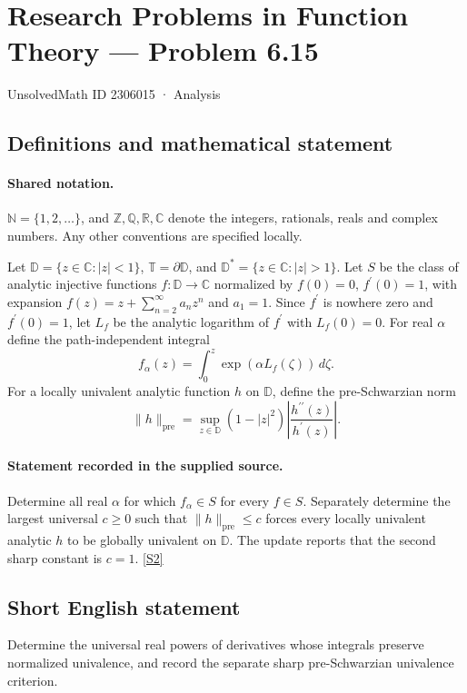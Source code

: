 \documentclass[11pt]{book}
\newcommand{\sref}[2]{\hyperlink{source:#1:#2}{[S#2]}}
\begin{document}
\setcounter{section}{2306014}
\section{Research Problems in Function Theory — Problem 6.15}\label{2306015}
{\small\sffamily UnsolvedMath ID 2306015 · Analysis}
\subsection{Definitions and mathematical statement}

\paragraph{Shared notation.}$\mathbb N=\{1,2,\ldots\}$, and $\mathbb Z,\mathbb Q,\mathbb R,\mathbb C$ denote the integers, rationals, reals and complex numbers. Any other conventions are specified locally.


Let $\mathbb D=\{z\in\mathbb C:|z|<1\}$, $\mathbb T=\partial\mathbb D$, and $\mathbb D^*=\{z\in\mathbb C:|z|>1\}$. Let $S$ be the class of analytic injective functions $f:\mathbb D\to\mathbb C$ normalized by $f(0)=0$, $f^{\prime}(0)=1$, with expansion $f(z)=z+\sum_{n=2}^{\infty}a_nz^n$ and $a_1=1$. Since $f^{\prime}$ is nowhere zero and $f^{\prime}(0)=1$, let $L_f$ be the analytic logarithm of $f^{\prime}$ with $L_f(0)=0$. For real $\alpha$ define the path-independent integral \[f_\alpha(z)=\int_0^z\exp(\alpha L_f(\zeta))\,d\zeta.\] For a locally univalent analytic function $h$ on $\mathbb D$, define the pre-Schwarzian norm \[\|h\|_{\mathrm{pre}}=\sup_{z\in\mathbb D}(1-|z|^2)\left|\frac{h^{\prime\prime}(z)}{h^{\prime}(z)}\right|.\]
\paragraph{Statement recorded in the supplied source.}
Determine all real $\alpha$ for which $f_\alpha\in S$ for every $f\in S$. Separately determine the largest universal $c\ge0$ such that $\|h\|_{\mathrm{pre}}\le c$ forces every locally univalent analytic $h$ to be globally univalent on $\mathbb D$. The update reports that the second sharp constant is $c=1$. \sref{2306015}{2}
\subsection{Short English statement}
Determine the universal real powers of derivatives whose integrals preserve normalized univalence, and record the separate sharp pre-Schwarzian univalence criterion.
\end{document}
